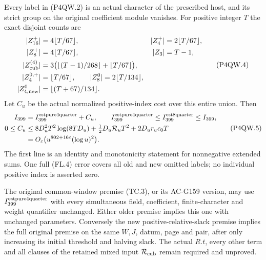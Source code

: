\begin{theorem}
\label{AC-G163-window}
Every label in (P4QW.2) is an actual character of the prescribed
host, and its strict group on the original coefficient module
vanishes.  For positive integer $T$ the exact disjoint counts are
\[
 \begin{aligned}
 |Z_{16}^+|&=4\lfloor T/67\rfloor,& |Z_4^+|&=2\lfloor T/67\rfloor,\\
 |Z_8^+|&=4\lfloor T/67\rfloor,& |Z_3|&=T-1,\\
 |Z_{\rm cub}^{(4)}|&=3\bigl(\lfloor(T-1)/268\rfloor
                                      +\lfloor T/67\rfloor\bigr),\\
 |Z_4^{0,+}|&=\lfloor T/67\rfloor,\qquad
 |Z_8^0|=2\lfloor T/134\rfloor,\\
 |Z_{4,\mathrm{new}}^0|&=\lfloor(T+67)/134\rfloor.
 \end{aligned}
 \tag{P4QW.4}
\]
Let $C_u$ be the actual normalized positive-index cost over
this entire union.  Then
\[
 \begin{aligned}
 I_{399}&=I_{399}^{\rm estpure4quarter}+C_u,\qquad
 I_{399}^{\rm estpure4quarter}\leq I_{399}^{\rm est8quarter}\leq I_{399},\\
 0\leq C_u&\leq8D_u^2T^2\log(8TD_u)
                   +\tfrac12D_u\mathcal R_uT^2+2D_ur_uc_0T\\
 &=O_\varepsilon\bigl(u^{802+16\varepsilon}(\log u)^2\bigr).
 \end{aligned}
 \tag{P4QW.5}
\]
The first line is an identity and monotonicity statement for
nonnegative extended sums.
One full (FL.4) error covers all old and new omitted labels;
no individual positive index is asserted zero.

The original common-window premise (TC.3), or its AC-G159 version,
may use $I_{399}^{\rm estpure4quarter}$ with every simultaneous field,
coefficient, finite-character and weight quantifier unchanged.
Either older premise implies this one with unchanged parameters.
Conversely the new positive-relative-slack premise implies the
full original premise on the same $W,J$, datum, page and pair,
after only increasing its initial threshold and halving slack.
The actual $R.t$, every other term and all clauses of the retained
mixed input $\mathcal R_{\rm cub}$ remain required and unproved.
\end{theorem}

